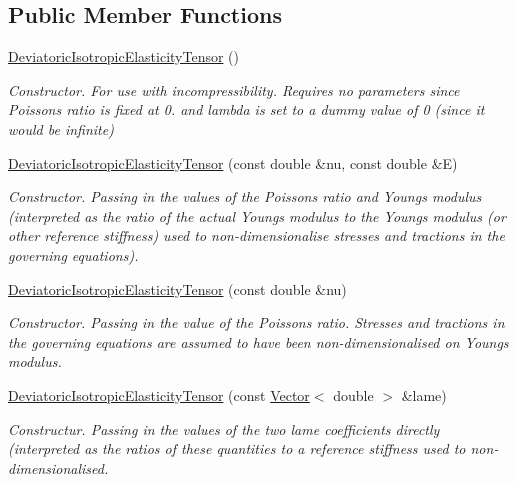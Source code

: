 \subsection*{Public Member Functions}
\begin{DoxyCompactItemize}
\item 
\hyperlink{classoomph_1_1DeviatoricIsotropicElasticityTensor_a1b4b704637b2e90c96d3b53b3c865ec8}{Deviatoric\+Isotropic\+Elasticity\+Tensor} ()
\begin{DoxyCompactList}\small\item\em Constructor. For use with incompressibility. Requires no parameters since Poisson\textquotesingle{}s ratio is fixed at 0. and lambda is set to a dummy value of 0 (since it would be infinite) \end{DoxyCompactList}\item 
\hyperlink{classoomph_1_1DeviatoricIsotropicElasticityTensor_a4f3edce9cd91008468599fb24b950707}{Deviatoric\+Isotropic\+Elasticity\+Tensor} (const double \&nu, const double \&E)
\begin{DoxyCompactList}\small\item\em Constructor. Passing in the values of the Poisson\textquotesingle{}s ratio and Young\textquotesingle{}s modulus (interpreted as the ratio of the actual Young\textquotesingle{}s modulus to the Young\textquotesingle{}s modulus (or other reference stiffness) used to non-\/dimensionalise stresses and tractions in the governing equations). \end{DoxyCompactList}\item 
\hyperlink{classoomph_1_1DeviatoricIsotropicElasticityTensor_a09fec2c25d55c5603723f2ab2531f78a}{Deviatoric\+Isotropic\+Elasticity\+Tensor} (const double \&nu)
\begin{DoxyCompactList}\small\item\em Constructor. Passing in the value of the Poisson\textquotesingle{}s ratio. Stresses and tractions in the governing equations are assumed to have been non-\/dimensionalised on Young\textquotesingle{}s modulus. \end{DoxyCompactList}\item 
\hyperlink{classoomph_1_1DeviatoricIsotropicElasticityTensor_aeed1da3ce892934b38ce4fda23c7f21c}{Deviatoric\+Isotropic\+Elasticity\+Tensor} (const \hyperlink{classoomph_1_1Vector}{Vector}$<$ double $>$ \&lame)
\begin{DoxyCompactList}\small\item\em Constructur. Passing in the values of the two lame coefficients directly (interpreted as the ratios of these quantities to a reference stiffness used to non-\/dimensionalised. \end{DoxyCompactList}\item 

\end{DoxyCompactItemize}
